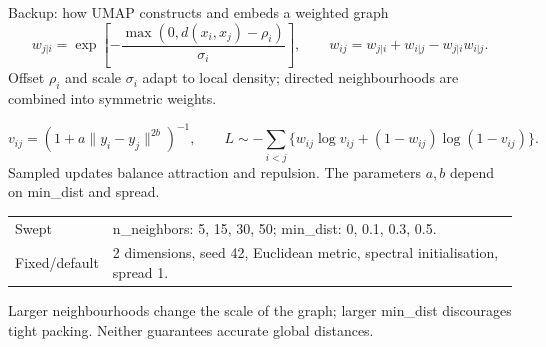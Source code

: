\documentclass[aspectratio=169,10pt]{beamer}
\begin{document}
\begin{frame}{Backup: how UMAP constructs and embeds a weighted graph}
  \small
  \[w_{j|i}=\exp\!\left[-\frac{\max(0,d(x_i,x_j)-\rho_i)}{\sigma_i}\right],\qquad
    w_{ij}=w_{j|i}+w_{i|j}-w_{j|i}w_{i|j}.\]
  Offset $\rho_i$ and scale $\sigma_i$ adapt to local density; directed neighbourhoods are combined into symmetric weights.\par
  \[v_{ij}=(1+a\lVert y_i-y_j\rVert^{2b})^{-1},\qquad
    L\sim-\sum_{i<j}\{w_{ij}\log v_{ij}+(1-w_{ij})\log(1-v_{ij})\}.\]
  Sampled updates balance attraction and repulsion. The parameters $a,b$ depend on min\_dist and spread.\par\smallskip
  \begin{tabular}{lp{}}\toprule
    Swept & n\_neighbors: 5, 15, 30, 50; min\_dist: 0, 0.1, 0.3, 0.5.\\
    Fixed/default & 2 dimensions, seed 42, Euclidean metric, spectral initialisation, spread 1.\\\bottomrule
  \end{tabular}\par\smallskip
  Larger neighbourhoods change the scale of the graph; larger min\_dist discourages tight packing. Neither guarantees accurate global distances.
\end{frame}
\end{document}
